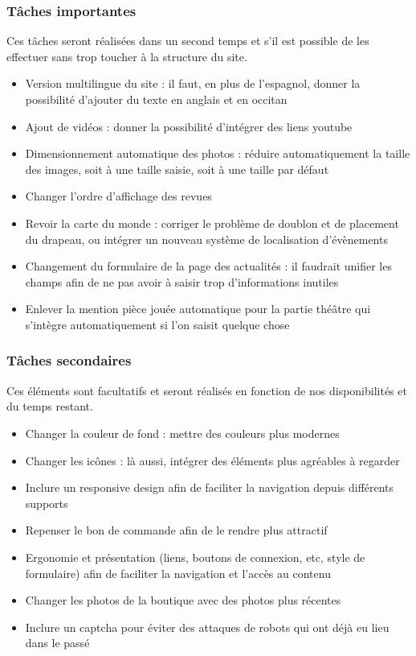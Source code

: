 \documentclass[11pt]{report}
\begin{document}
\subsubsection*{Tâches importantes}
Ces tâches seront réalisées dans un second temps et s'il est possible de les effectuer 
sans trop toucher à la structure du site.
\begin{itemize}
 \item Version multilingue du site : il faut, en plus de l'espagnol, donner la
possibilité d'ajouter du texte en anglais et en occitan 
 \item Ajout de vidéos : donner la possibilité d'intégrer des liens youtube
 \item Dimensionnement automatique des photos : réduire automatiquement la
taille des images, soit à une taille saisie, soit à une taille par défaut 
 \item Changer l'ordre d'affichage des revues
 \item Revoir la carte du monde : corriger le problème de doublon et de
placement du drapeau, ou intégrer un nouveau système de localisation d’évènements
 \item Changement du formulaire de la page des actualités : il faudrait unifier
 les champs afin de ne pas avoir à saisir trop d'informations inutiles
 \item Enlever la mention \og pièce jouée \fg automatique pour la partie théâtre
 qui s'intègre automatiquement si l'on saisit quelque chose
\end{itemize}


\subsubsection*{Tâches secondaires}
Ces éléments sont facultatifs et seront réalisés en fonction de nos disponibilités et du temps restant.
\begin{itemize}
\item Changer la couleur de fond : mettre des couleurs plus modernes
\item Changer les icônes : là aussi, intégrer des éléments plus agréables à
regarder
\item Inclure un responsive design afin de faciliter la navigation depuis
différents supports
\item Repenser le bon de commande afin de le rendre plus attractif
\item Ergonomie et présentation (liens, boutons de connexion, etc, style de
formulaire) afin de faciliter la navigation et l'accès au contenu
\item Changer les photos de la boutique avec des photos plus récentes
\item Inclure un captcha pour éviter des attaques de robots qui ont déjà eu lieu
dans le passé
\end{itemize}
\end{document}
